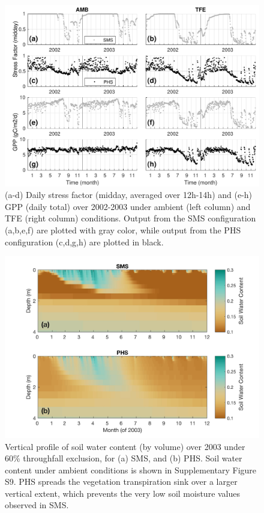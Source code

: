 \documentclass[draft,linenumbers]{agujournal}
\begin{document}
          \clearpage   
  \begin{figure}[h]
     \centering
     \includegraphics[width=30pc]{gpp.pdf}
     \caption{(a-d) Daily stress factor (midday, averaged over 12h-14h) and (e-h) GPP (daily total) over 2002-2003 under ambient (left column) and TFE (right column) conditions.
     Output from the SMS configuration (a,b,e,f) are plotted with gray color, while output from the PHS configuration (c,d,g,h) are plotted in black.
     }
     \label{fig:gpp}
  \end{figure} 



      \clearpage
    \begin{figure}[h]
     \centering
     \includegraphics[width=30pc]{smp.jpg}
     \caption{Vertical profile of soil water content (by volume) over 2003 under 60\% throughfall exclusion, for
     (a) SMS, and 
     (b) PHS.
     Soil water content under ambient conditions is shown in Supplementary Figure S9.
PHS spreads the vegetation transpiration sink over a larger vertical extent, which prevents the very low soil moisture values observed in SMS.
 }
     \label{fig:sm}
  \end{figure}
\end{document}
